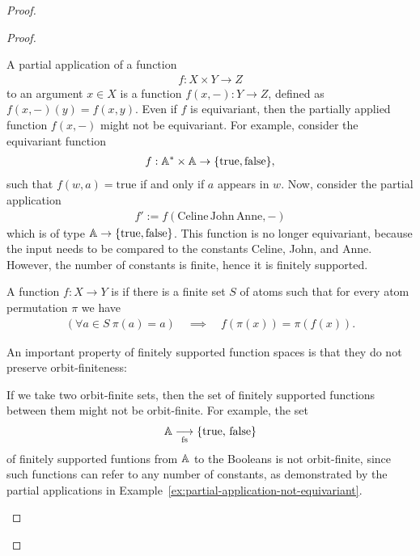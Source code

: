 \begin{proof}
\begin{proof}
        \begin{myexample}
        \label{ex:partial-application-not-equivariant}
        A partial application of a function 
        \begin{align*}
        f : X \times Y \to Z
        \end{align*}
        to an argument $x \in X$ is a function $f(x, -) : Y \to Z$, defined as $f(x, -)(y) = f(x,y)$. Even if $f$ is equivariant, then the  partially applied function $f(x, -)$ might not be equivariant. For example, consider the equivariant function
        \begin{align*}
        f: {\mathbb A^* \times \mathbb A} \to  {\{\textrm{true}, \textrm{false}\}},
        \end{align*}
        such that $f(w, a) = \textrm{true}$ if and only if $a$ appears in $w$. Now, consider the partial application
        \begin{align*}
        f' := f(\textrm{Celine}\, \textrm{John}\, \textrm{Anne}, -)
        \end{align*}
        which is of type $\mathbb A \to \{\textrm{true}, \textrm{false}\}$. This function is no longer equivariant, because the input needs to be compared to the constants Celine, John, and Anne. However, the number of constants is finite, hence it is finitely supported.
      \end{myexample}
      \begin{definition} 
        \label{def:finitely supported-function}
        \AP
         A function $f : X \to Y$ is  if there is a finite set $S$ of atoms such that for every atom permutation $\pi$ we have 
        \begin{align*}
            (\forall a \in S\ \pi(a)=a) 
            \quad \implies \quad f(\pi(x)) = \pi(f(x)).
        \end{align*}
      \end{definition}
      An important property of finitely supported function spaces is that they do not preserve orbit-finiteness: 

      \begin{myexample} If we take two orbit-finite sets, then the set of finitely supported functions between them might not be orbit-finite. For example, the set
        \begin{align*}
        \mathbb A \underset{\text{fs}}{\longrightarrow} \{\text{true, false}\}
        \end{align*}
        of finitely supported funtions from $\mathbb A$ to the Booleans  is not orbit-finite, since such functions can refer to any number of constants, as demonstrated by the partial applications in Example~\ref{ex:partial-application-not-equivariant}.
      \end{myexample}


\end{proof}
\end{proof}
